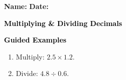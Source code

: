 \documentclass[12pt, letterpaper, fleqn]{article}
\begin{document}
\textbf{Name:} \underline{\hspace{5cm}}
\hfill
\textbf{Date:} \underline{\hspace{3cm}}\\

\begin{tcolorbox}[colback=customteal!20]
    \large\textcolor{black}{\textbf{Multiplying \& Dividing Decimals}}
\end{tcolorbox}
\newpage
\begin{tcolorbox}[colback=customteal!20]
    \large\textcolor{black}{\textbf{Guided Examples}}
\end{tcolorbox}
\begin{enumerate}[itemsep=3.5cm, leftmargin=0.6cm]
\item Multiply: $2.5 \times 1.2$.
\vspace{3cm}
\item Divide: $4.8 \div 0.6$.
\end{enumerate}
\end{document}
